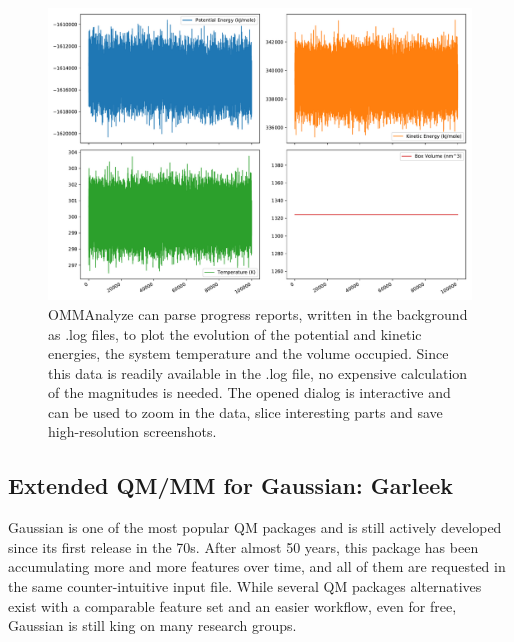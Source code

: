 \begin{figure}[H] %
	\begin{Center}
		\includegraphics[width=\textwidth]{./figures/05/ommanalyze.pdf}
	\end{Center}
	\caption[Example results with OMMAnalyze]{OMMAnalyze can parse progress reports, written in the background as .log files, to plot the evolution of the potential and kinetic energies, the system temperature and the volume occupied. Since this data is readily available in the .log file, no expensive calculation of the magnitudes is needed. The opened dialog is interactive and can be used to zoom in the data, slice interesting parts and save high-resolution screenshots.}
	\label{fig:ommanalyze}
\end{figure}


\subsection{Extended QM/MM for Gaussian: Garleek}


Gaussian\cite{gaussian} is one of the most popular QM packages and is still actively developed since its first release in the 70s. After almost 50 years, this package has been accumulating more and more features over time, and all of them are requested in the same counter-intuitive input file. While several QM packages alternatives exist with a comparable feature set and an easier workflow, even for free,\cite{nwchem} Gaussian is still king on many research groups.

